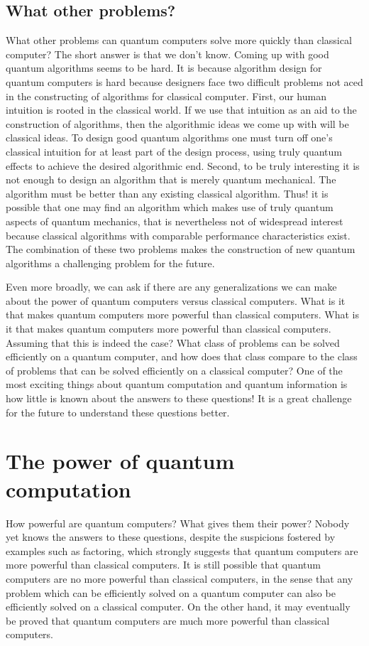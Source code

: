 \documentclass[12pt, oneside]{book}
\theoremstyle{definition}
\theoremstyle{definition}
\theoremstyle{remark}
\begin{document}
\subsection{What other problems?}
What other problems can quantum computers solve more quickly than classical computer? The short answer is that we don't know. Coming up with good quantum algorithms seems to be hard. It is because algorithm design for quantum computers is hard because designers face two difficult problems not aced in the constructing of algorithms for classical computer. First, our human intuition is rooted in the classical world. If we use that intuition as an aid to the construction of algorithms, then the algorithmic ideas we come up with will be classical ideas. To design good quantum algorithms one must turn off one's classical intuition for at least part of the design process, using truly quantum effects to achieve the desired algorithmic end. Second, to be truly interesting it is not enough to design an algorithm that is merely quantum mechanical. The algorithm must be better than any existing classical algorithm. Thus! it is possible that one may find an algorithm which makes use of truly quantum aspects of quantum mechanics, that is nevertheless not of widespread interest because classical algorithms with comparable performance characteristics exist. The combination of these two problems makes the construction of new quantum algorithms a challenging problem for the future.

Even more broadly, we can ask if there are any generalizations we can make about the power of quantum computers versus classical computers. What is it that makes quantum computers more powerful than classical computers. What is it that makes quantum computers more powerful than classical computers. Assuming that this is indeed the case? What class of problems can be solved efficiently on a quantum computer, and how does that class compare to the class of problems that can be solved efficiently on a classical computer? One of the most exciting things about quantum computation and quantum information  is how little is known about the answers to these questions! It is a great challenge for the future to understand these questions better.


\section{The power of quantum computation}
How powerful are quantum computers? What gives them their power? Nobody yet knows the answers to these questions, despite the suspicions fostered by examples such as factoring, which strongly suggests that quantum computers are more powerful than classical computers. It is still possible that quantum computers are no more powerful than classical computers, in the sense that any problem which can be efficiently solved on a quantum computer can also be efficiently solved on a classical computer. On the other hand, it may eventually be proved that quantum computers are much more powerful than classical computers. 
\end{document}
